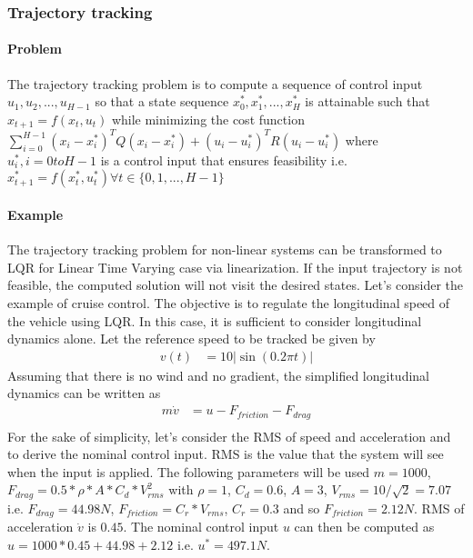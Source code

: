 \subsubsection{Trajectory tracking}
\paragraph{Problem} The trajectory tracking problem is to compute a sequence of control input $u_1, u_2, ..., u_{H-1}$ so that a state sequence $x_0^*, x_1^*, ..., x_H^*$ is attainable such that $x_{t+1}=f(x_t, u_t)$ while minimizing the cost function $\sum_{i=0}^{H-1}(x_i - x_i^*)^T Q (x_i - x_i^*) + (u_i - u_i^*)^T R (u_i - u_i^*)$ where $u_i^*, i=0 to H-1$ is a control input that ensures feasibility i.e. $x_{t+1}^*=f(x_t^*, u_t^*) {} \forall t \in \{0, 1, ..., H-1\}$
\paragraph{Example}
The trajectory tracking problem for non-linear systems can be transformed to LQR for Linear Time Varying case via linearization. If the input trajectory is not feasible, the computed solution will not visit the desired states.
Let's consider the example of cruise control. The objective is to regulate the longitudinal speed of the vehicle using LQR. In this case, it is sufficient to consider longitudinal dynamics alone. Let the reference speed to be tracked be given by
\begin{align}
    v(t) &= 10|\sin(0.2\pi t)|
\end{align}
Assuming that there is no wind and no gradient, the simplified longitudinal dynamics can be written as
\begin{align}
    m\dot{v} &= u - F_{friction} - F_{drag}  \label{chap_2:eq:long_traj_tracking}\\ 
\end{align}
For the sake of simplicity, let's consider the RMS of speed and acceleration and to derive the nominal control input. RMS is the value that the system will see when the input is applied.
The following parameters will be used 
$m = 1000$, $F_{drag} = 0.5 * \rho * A * C_d * V_{rms}^2$ with $\rho = 1$, $C_d =0.6$, $A = 3$, $V_{rms} = 10/\sqrt{2} = 7.07$ i.e. $F_{drag}=44.98 N$, $F_{friction}=C_r*V_{rms}$, $C_r=0.3$ and so $F_{friction}=2.12 N$. RMS of acceleration $\dot{v}$ is $0.45$.
The nominal control input $u$ can then be computed as $u = 1000 * 0.45 + 44.98 + 2.12$ i.e. $u^{*}=497.1 N$.

